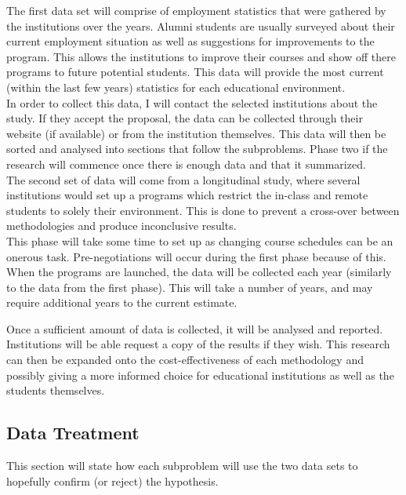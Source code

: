 \documentclass[titlepage]{article}
\begin{document}
\noindent The first data set will comprise of employment statistics that were gathered by the institutions
over the years.  Alumni students are usually surveyed about their current employment situation as well as
suggestions for improvements to the program.  This allows the institutions to improve their
courses and show off there programs to future potential students.  This data will provide the most current
(within the last few years) statistics for each educational environment.\\

\noindent In order to collect this data, I will contact the selected institutions about the study.
If they accept the proposal, the data can be collected through their website (if available) or
from the institution themselves. This data will then be sorted and analysed into sections that follow
the subproblems.  Phase two if the research will commence once there is enough data and that it summarized.\\

\noindent The second set of data will come from a longitudinal study, where several institutions would
set up a programs which restrict the in-class and remote students to solely their environment.  This
is done to prevent a cross-over between methodologies and produce inconclusive results.\\

\noindent This phase will take some time to set up as changing course schedules can be an onerous task.
Pre-negotiations will occur during the first phase because of this.  When the programs are launched,
the data will be collected each year (similarly to the data from the first phase).  This will take
a number of years, and may require additional years to the current estimate.\\

\clearpage

\noindent Once a sufficient amount of data is collected, it will be analysed and reported.
Institutions will be able request a copy of the results if they wish.  This research can then
be expanded onto the cost-effectiveness of each methodology and possibly giving a more informed
choice for educational institutions as well as the students themselves.\\

\subsection{Data Treatment}
This section will state how each subproblem will use the two data sets to hopefully confirm
(or reject) the hypothesis.
\end{document}
